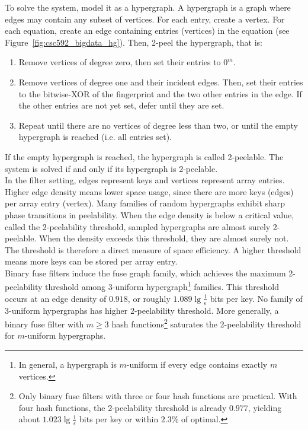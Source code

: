 

\noindent
To solve the system, model it as a hypergraph. A hypergraph is a graph where edges may contain any subset of vertices. For each entry, create a vertex. For each 
equation, create an edge containing entries (vertices) in the equation (see Figure~\ref{fig:csc592_bigdata_hg}). Then, 2-peel the hypergraph, that is:
\begin{enumerate}
    \item Remove vertices of degree zero, then set their entries to $0^m$.
    \item Remove vertices of degree one and their incident edges. Then, set their entries to the bitwise-XOR of the fingerprint and the two other entries in the
    edge. If the other entries are not yet set, defer until they are set.
    \item Repeat until there are no vertices of degree less than two, or until the empty hypergraph is reached (i.e. all entries set).
\end{enumerate}
If the empty hypergraph is reached, the hypergraph is called 2-peelable. The system is solved if and only if its hypergraph is 2-peelable. \\



\noindent
In the filter setting, edges represent keys and vertices represent array entries. Higher edge density means lower space usage, since there are more keys (edges)
per array entry (vertex). Many families of random hypergraphs exhibit sharp phase transitions in peelability. When the edge density is below a critical value, 
called the 2-peelability threshold, sampled hypergraphs are almost surely 2-peelable. When the density exceeds this threshold, they are almost surely not. The 
threshold is therefore a direct measure of space efficiency. A higher threshold means more keys can be stored per array entry. \\

\noindent
Binary fuse filters induce the fuse graph family, which achieves the maximum 2-peelability threshold among 3-uniform hypergraph\footnote{In general, a 
hypergraph is $m$-uniform if every edge contains exactly $m$ vertices.} families. This threshold occurs at an edge density of $0.918$, or roughly 
$1.089 \lg \frac{1}{\epsilon}$ bits per key. No family of 3-uniform hypergraphs has higher 2-peelability threshold. More generally, a binary fuse filter with 
$m \geq 3$ hash functions\footnote{Only binary fuse filters with three or four hash functions are practical. With four hash functions, the 2-peelability 
threshold is already $0.977$, yielding about $1.023 \lg \frac{1}{\epsilon}$ bits per key or within $2.3\%$ of optimal.} saturates the 2-peelability threshold 
for $m$-uniform hypergraphs. \\

